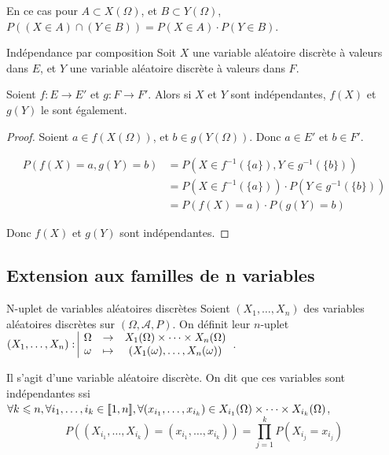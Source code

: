 \begin{corollaire}{}{}
    En ce cas pour $A \subset X(\Omega)$, et $B \subset Y(\Omega)$,
    $P((X \in A) \cap (Y \in B)) = P(X \in A) \cdot P(Y \in B)$.
\end{corollaire}

\begin{proposition}{Indépendance par composition}{}
    Soit $X$ une variable aléatoire discrète à valeurs dans $E$, et 
    $Y$ une variable aléatoire discrète à valeurs dans $F$. 

    Soient $f : E \to E'$ et $g : F \to F'$. Alors si $X$ et $Y$ sont indépendantes,
    $f(X)$ et $g(Y)$ le sont également.
\end{proposition}

\begin{proof}
    Soient $a \in f(X(\Omega))$, et $b \in g(Y(\Omega))$. Donc $a \in E'$ et $b \in F'$.

    \begin{align}
        P(f(X) = a, g(Y) = b) & = P(X \in f^{-1}(\{a\}), Y \in g^{-1}(\{b\})) \\
        & = P(X \in f^{-1}(\{a\})) \cdot P(Y \in g^{-1}(\{b\})) \\
        & = P(f(X) = a) \cdot P(g(Y) = b)
    \end{align}

    Donc $f(X)$ et $g(Y)$ sont indépendantes.
\end{proof}

\subsection{Extension aux familles de n variables }

\begin{proposition}{N-uplet de variables aléatoires discrètes}{}
    Soient $(X_1, \dots, X_n)$ des variables aléatoires discrètes sur 
    $(\Omega, \mathcal A, P)$. On définit leur $n$-uplet 
    $(X_1, \dots, X_n): \space \begin{array}{|ccc} \displaystyle \Omega & \to & \displaystyle X_1(\Omega) \times \cdots \times X_n(\Omega) \\ \displaystyle \omega & \mapsto & \displaystyle (X_1(\omega), \dots, X_n(\omega)) \end{array}$.

    Il s'agit d'une variable aléatoire discrète. On dit que ces variables sont indépendantes 
    ssi $\forall k \leqslant n, \forall i_1, \dots, i_k \in [\![1, n]\!], \forall (x_{i_1}, \dots, x_{i_k}) \in X_{i_1}(\Omega) \times \cdots \times X_{i_k}(\Omega)$,
    $$ P((X_{i_1}, \dots, X_{i_k}) = (x_{i_1}, \dots, x_{i_k})) = \prod_{j = 1}^k P(X_{i_j} = x_{i_j})$$
\end{proposition}

